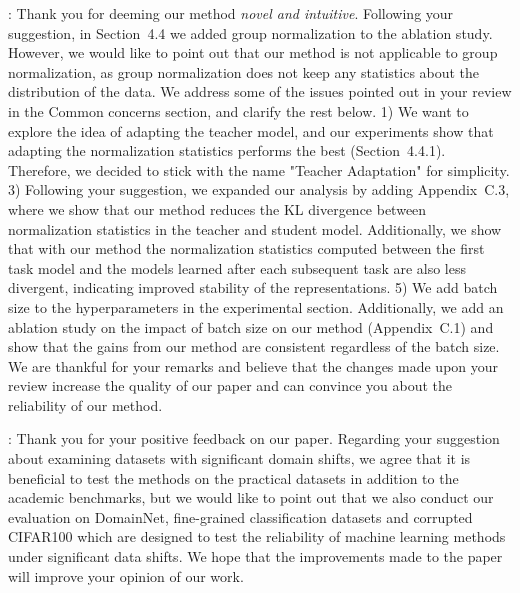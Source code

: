 \documentclass[10pt,twocolumn,letterpaper]{article}
\newcommand{\Reight}{{\bfseries\color{magenta} R8}}
\newcommand{\Rnine}{{\bfseries\color{blue} R9}}
\begin{document}
\noindent \Reight: Thank you for deeming our method \textit{novel and intuitive}. 
Following your suggestion, in Section~4.4 we added group normalization to the ablation study. However, we would like to point out that our method is not applicable to group normalization, as group normalization does not keep any statistics about the distribution of the data.
We address some of the issues pointed out in your review in the Common concerns section, and clarify the rest below.
1) We want to explore the idea of adapting the teacher model, and our experiments show that adapting the normalization statistics performs the best (Section~4.4.1). Therefore, we decided to stick with the name "Teacher Adaptation" for simplicity.
3) Following your suggestion, we expanded our analysis by adding Appendix~C.3, where we show that our method reduces the KL divergence between normalization statistics in the teacher and student model. Additionally, we show that with our method the normalization statistics computed between the first task model and the models learned after each subsequent task are also less divergent, indicating improved stability of the representations.
5) We add batch size to the hyperparameters in the experimental section. Additionally, we add an ablation study on the impact of batch size on our method (Appendix~C.1) and show that the gains from our method are consistent regardless of the batch size.
We are thankful for your remarks and believe that the changes made upon your review increase the quality of our paper and can convince you about the reliability of our method.

\noindent \Rnine: Thank you for your positive feedback on our paper. 
Regarding your suggestion about examining datasets with significant domain shifts, we agree that it is beneficial to test the methods on the practical datasets in addition to the academic benchmarks, but we would like to point out that we also conduct our evaluation on DomainNet, fine-grained classification datasets and corrupted CIFAR100 which are designed to test the reliability of machine learning methods under significant data shifts. We hope that the improvements made to the paper will improve your opinion of our work.

%
%
\end{document}
